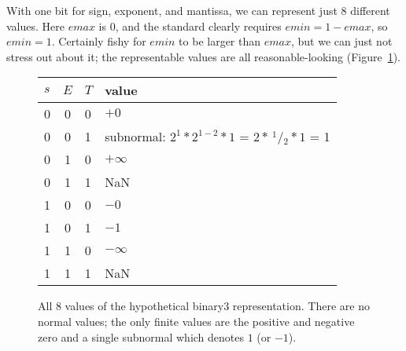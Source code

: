 \documentclass[twocolumn]{article}
\newcommand\sfrac[2]{\!{}\,^{#1}\!/{}\!_{#2}}
\newcommand\nan{\textsf{NaN}}
\begin{document}
With one bit for sign, exponent, and mantissa, we can represent just 8
different values. Here $emax$ is $0$, and the standard clearly
requires $emin = 1 - emax$, so $emin = 1$. Certainly fishy for $emin$
to be larger than $emax$, but we can just not stress out about it; the
representable values are all reasonable-looking
(Figure~\ref{fig:allvalues3}).


\begin{figure}[h]
\begin{tabular}{|l@{\,}c@{\,}l|p{2.5in}|}
\hline
  $s$ & $E$ & $T$ & value \\
  \hline
0 & 0 & 0 &   $+0$ \\
0 & 0 & 1 &    subnormal: %
                $2^1 * 2^{1-2} * 1$ =
                $2 * \sfrac{1}{2} * 1$ = 1 \\
0 & 1 & 0 &   $+\infty$ \\
0 & 1 & 1 &    \nan \\
1 & 0 & 0 &   $-0$ \\
1 & 0 & 1 &   $-1$ \\
1 & 1 & 0 &   $-\infty$ \\
1 & 1 & 1 &    \nan \\
\hline
\end{tabular}
\caption{All 8 values of the hypothetical binary3 representation.
  There are no normal values; the only finite values are the
  positive and negative zero and a single subnormal which
  denotes $1$ (or $-1$).
} \label{fig:allvalues3}
\end{figure}



\end{document}
